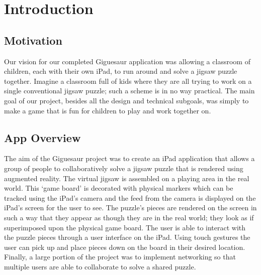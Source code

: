 \documentclass{article}
\begin{document}
\section{Introduction}


\subsection{Motivation}

Our vision for our completed Giguesaur application was allowing a classroom of children, each with their own iPad, to run around and solve a jigsaw puzzle together. Imagine a classroom full of kids where they are all trying to work on a single conventional jigsaw puzzle; such a scheme is in no way practical. The main goal of our project, besides all the design and technical subgoals, was simply to make a game that is fun for children to play and work together on. 

\subsection{App Overview}

The aim of the Giguesaur project was to create an iPad application that allows a group of people to collaboratively solve a jigsaw puzzle that is rendered using augmented reality. The virtual jigsaw is assembled on a playing area in the real world. This `game board' is decorated with physical markers which can be tracked using the iPad's camera and the feed from the camera is displayed on the iPad's screen for the user to see. The puzzle's pieces are rendered on the screen in such a way that they appear as though they are in the real world; they look as if superimposed upon the physical game board. The user is able to interact with the puzzle pieces through a user interface on the iPad. Using touch gestures the user can pick up and place pieces down on the board in their desired location. Finally, a large portion of the project was to implement networking so that multiple users are able to collaborate to solve a shared puzzle. 
\end{document}
